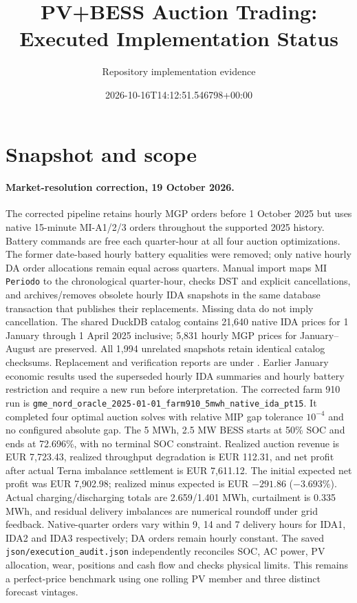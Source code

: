 \documentclass[11pt,a4paper]{article}
\title{PV+BESS Auction Trading: Executed Implementation Status}
\author{Repository implementation evidence}
\date{2026-10-16T14:12:51.546798+00:00}
\begin{document}
\maketitle
\section{Snapshot and scope}
\paragraph{Market-resolution correction, 19 October 2026.}
The corrected pipeline retains hourly MGP orders before 1 October 2025 but uses
native 15-minute MI-A1/2/3 orders throughout the supported 2025 history. Battery
commands are free each quarter-hour at all four auction optimizations. The former
date-based hourly battery equalities were removed; only native hourly DA order
allocations remain equal across quarters. Manual import maps MI \texttt{Periodo}
to the chronological quarter-hour, checks DST and explicit cancellations, and
archives/removes obsolete hourly IDA snapshots in the same database transaction
that publishes their replacements. Missing data do not imply cancellation.
The shared DuckDB catalog contains 21,640 native IDA prices for 1 January through
1 April 2025 inclusive; 5,831 hourly MGP prices for January--August are preserved.
All 1,994 unrelated snapshots retain identical catalog checksums. Replacement
and verification reports are under .
Earlier January economic results used the superseded hourly IDA summaries and
hourly battery restriction and require a new run before interpretation.
The corrected farm 910 run is
\texttt{gme\_nord\_oracle\_2025-01-01\_farm910\_5mwh\_native\_ida\_pt15}.
It completed four optimal auction solves with relative MIP gap tolerance
$10^{-4}$ and no configured absolute gap. The 5 MWh, 2.5 MW BESS starts at
50\% SOC and ends at 72.696\%, with no terminal SOC constraint. Realized auction
revenue is EUR 7,723.43, realized throughput degradation is EUR 112.31, and net
profit after actual Terna imbalance settlement is EUR 7,611.12. The initial
expected net profit was EUR 7,902.98; realized minus expected is EUR $-291.86$
($-3.693$\%). Actual charging/discharging totals are 2.659/1.401 MWh, curtailment
is 0.335 MWh, and residual delivery imbalances are numerical roundoff under
grid feedback. Native-quarter orders vary within 9, 14 and 7 delivery hours
for IDA1, IDA2 and IDA3 respectively; DA orders remain hourly constant.
The saved \texttt{json/execution\_audit.json} independently reconciles SOC,
AC power, PV allocation, wear, positions and cash flow and checks physical
limits. This remains a perfect-price benchmark using one rolling PV member
and three distinct forecast vintages.
\end{document}
